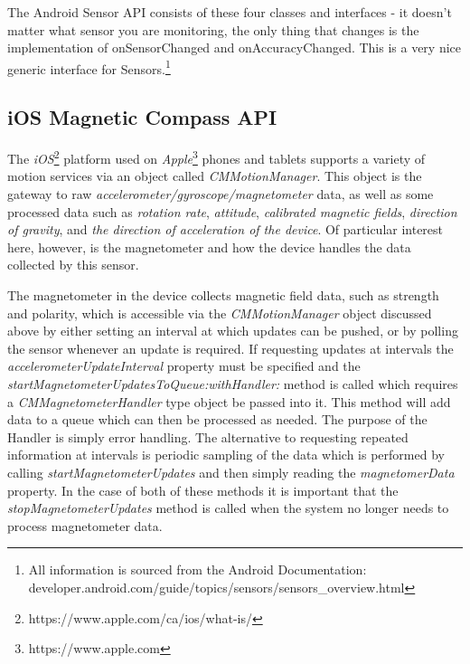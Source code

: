 \documentclass[paper=letter, fontsize=11pt]{scrartcl}
\numberwithin{equation}{section}
\numberwithin{figure}{section}
\numberwithin{table}{section}
\begin{document}
\par
The Android Sensor API consists of these four classes and interfaces - it doesn't matter what sensor you are monitoring, the only thing that changes is the implementation of onSensorChanged and onAccuracyChanged. This is a very nice generic interface for Sensors.\footnote{All information is sourced from the Android Documentation: developer.android.com/guide/topics/sensors/sensors\_overview.html}

\subsection{iOS Magnetic Compass API}
\label{ios_compass_api}
\par
The {\em iOS}\footnote{https://www.apple.com/ca/ios/what-is/} platform used on
{\em Apple}\footnote{https://www.apple.com} phones and tablets supports a
variety of motion services via an object called {\em CMMotionManager}. This
object is the gateway to raw {\em accelerometer/gyroscope/magnetometer} data, as
well as some processed data such as {\em rotation rate}, {\em attitude},
{\em calibrated magnetic fields}, {\em direction of gravity}, and {\em the
direction of acceleration of the device}.
Of particular interest here, however, is the magnetometer and how the device
handles the data collected by this sensor.

\par
The magnetometer in the device collects magnetic field data, such as strength
and polarity, which is accessible via the {\em CMMotionManager} object discussed
above by either setting an interval at which updates can be pushed, or by
polling the sensor whenever an update is required. If requesting updates at
intervals the {\em accelerometerUpdateInterval} property must be specified and
the {\em startMagnetometerUpdatesToQueue:withHandler:} method is called which
requires a {\em CMMagnetometerHandler} type object be passed into it. This
method will add data to a queue which can then be processed as needed. The
purpose of the Handler is simply error handling. The alternative to requesting
repeated information at intervals is periodic sampling of the data which is
performed by calling {\em startMagnetometerUpdates} and then simply reading the
{\em magnetomerData} property. In the case of both of these methods it is
important that the {\em stopMagnetometerUpdates} method is called when the
system no longer needs to process magnetometer data. 
\end{document}
